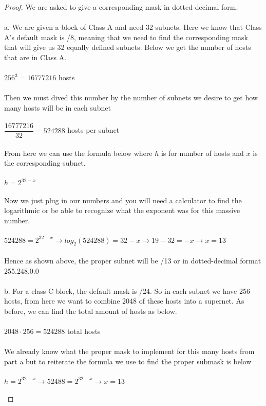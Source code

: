 \documentclass[12pt]{article}
\begin{document}
\begin{proof}
We are asked to give a corresponding mask in dotted-decimal form. \\ \\
a. We are given a block of Class A and need 32 subnets. Here we know that Class A's default mask is /8, meaning that we need to find the corresponding mask that will give us 32 equally defined subnets. Below we get the number of hosts that are in Class A. 
\\ \\ 
$256^{3} = 16777216$ hosts
\\ \\ Then we must dived this number by the number of subnets we desire to get how many hosts will be in each subnet \\ \\
$\dfrac{16777216}{32} = 524288$ hosts per subnet
\\ \\
From here we can use the formula below where $h$ is for number of hosts and $x$ is the corresponding subnet. \\ \\
$h = 2^{32 - x}$ 
\\ \\
Now we just plug in our numbers and you will need a calculator to find the logarithmic or be able to recognize what the exponent was for this massive number. \\ \\
$524288 = 2^{32-x} \rightarrow log_{2}(524288) = 32 - x \rightarrow 19 - 32 = - x \rightarrow x = 13$ \\ \\
Hence as shown above, the proper subnet will be /13 or in dotted-decimal format 255.248.0.0 \\ \\
b. For a class C block, the default mask is /24. So in each subnet we have 256 hosts, from here we want to combine 2048 of these hosts into a supernet. As before, we can find the total amount of hosts as below. \\ \\
$2048 \cdot 256 = 524288$ total hosts \\ \\
We already know what the proper mask to implement for this many hosts from part a but to reiterate the formula we use to find the proper submask is below \\ \\ 
$h = 2^{32 -x} \rightarrow 52488 = 2^{32 - x} \rightarrow x = 13$ \\ \\ 

\end{proof}
\end{document}
